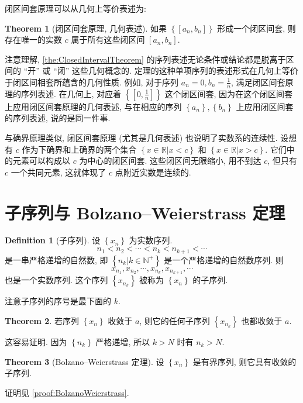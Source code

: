 \documentclass{book}
\newcommand{\set}[1]{\left\{#1\right\}}
\newcommand{\R}{\mathbb{R}}
\newcommand{\N}{\mathbb{N}}
\numberwithin{equation}{section}
\numberwithin{figure}{section}
\theoremstyle{definition}
\newtheorem{definition}{Definition}
\newtheorem{theorem}{Theorem}[section]
\begin{document}
闭区间套原理可以从几何上等价表述为:
\begin{theorem}[闭区间套原理, 几何表述]
  如果 $\set{[a_n,b_n]}$ 形成一个闭区间套, 则存在唯一的实数 $c$ 属于所有这些闭区间 $[a_n,b_n]$.
\end{theorem}

注意理解, \cref{the:ClosedIntervalTheorem} 的序列表述无论条件或结论都是脱离于区间的 ``开'' 或 ``闭'' 这些几何概念的. 定理的这种单项序列的表述形式在几何上等价于闭区间相套所蕴含的几何性质.
例如, 对于序列 $a_n=0,b_n=\frac{1}{n}$, 满足闭区间套原理的序列表述. 在几何上, 对应着 $\set{\left[ 0,\frac{1}{n} \right]}$ 这个闭区间套, 因为在这个闭区间套上应用闭区间套原理的几何表述, 与在相应的序列 $\set{a_n},\set{b_n}$ 上应用闭区间套的序列表述, 说的是同一件事.

与确界原理类似, 闭区间套原理 (尤其是几何表述) 也说明了实数系的连续性. 设想有 $c$ 作为下确界和上确界的两个集合 $\set{x\in\R|x<c}$ 和 $\set{x\in\R|x>c}$. 它们中的元素可以构成以 $c$ 为中心的闭区间套. 这些闭区间无限缩小, 用不到达 $c$, 但只有 $c$ 一个共同元素, 这就体现了 $c$ 点附近实数是连续的.

\section{子序列与 Bolzano--Weierstrass 定理}
\begin{definition}[子序列]
  设 $\set{x_n}$ 为实数序列.
  \begin{equation*}
    n_1<n_2<\cdots<n_k<n_{k+1}<\cdots
  \end{equation*}
  是一串严格递增的自然数, 即 $\set{n_k|k\in\N^+}$ 是一个严格递增的自然数序列. 则
  \begin{equation*}
    x_{n_1},x_{n_2},\cdots,x_{n_k},x_{n_{k+1}},\cdots
  \end{equation*}
  也是一个实数序列. 这个序列 $\set{x_{n_k}}$ 被称为 $\set{x_n}$ 的子序列.
\end{definition}
注意子序列的序号是最下面的 $k$.

\begin{theorem}
  若序列 $\set{x_n}$ 收敛于 $a$, 则它的任何子序列 $\set{x_{n_k}}$ 也都收敛于 $a$.
  \label{the:SubsequenceSameLimit}
\end{theorem}
这容易证明. 因为 $\set{n_k}$ 严格递增, 所以 $k>N$ 时有 $n_k>N$.

\begin{theorem}[Bolzano--Weierstrass 定理]
  设 $\set{x_n}$ 是有界序列, 则它具有收敛的子序列.
  \label{the:BolzanoWeierstrass}
\end{theorem}
证明见 \cref{proof:BolzanoWeierstrass}.
\end{document}
